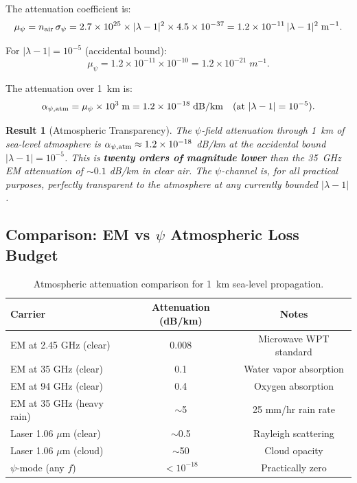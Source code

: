 \documentclass[aps,prd,twocolumn,superscriptaddress]{revtex4-2}
\newtheorem{result}{Result}
\begin{document}
The attenuation coefficient is:
\begin{equation}
\mu_\psi = n_{\rm air}\,\sigma_\psi
= 2.7\times10^{25} \times |\lambda-1|^2 \times 4.5\times10^{-37}
= 1.2\times10^{-11}\,|\lambda-1|^2\;\si{m^{-1}}.
\label{eq:mu-psi}
\end{equation}

For $|\lambda - 1| = 10^{-5}$ (accidental bound):
\begin{equation}
\mu_\psi = 1.2\times10^{-11} \times 10^{-10}
= 1.2\times10^{-21}\;\si{m^{-1}}.
\label{eq:mu-num}
\end{equation}

The attenuation over 1~km is:
\begin{equation}
\alpha_{\psi,\rm atm} = \mu_\psi \times 10^3\;\si{m}
= 1.2\times10^{-18}\;\si{dB/km} \quad
\text{(at }|\lambda-1| = 10^{-5}\text{)}.
\label{eq:alpha-atm}
\end{equation}

\begin{result}[Atmospheric Transparency]
The $\psi$-field attenuation through 1~km of sea-level atmosphere is
$\alpha_{\psi,\rm atm} \approx 1.2\times10^{-18}$ dB/km at the
accidental bound $|\lambda-1| = 10^{-5}$.  This is \textbf{twenty
orders of magnitude lower} than the 35~GHz EM attenuation of
$\sim 0.1$ dB/km in clear air.  The $\psi$-channel is, for all
practical purposes, perfectly transparent to the atmosphere at any
currently bounded $|\lambda - 1|$.
\end{result}

\subsection{Comparison: EM vs $\psi$ Atmospheric Loss Budget}

\begin{table}[h]
\caption{Atmospheric attenuation comparison for 1~km sea-level propagation.}
\label{tab:atm-loss}
\begin{ruledtabular}
\begin{tabular}{lcc}
Carrier & Attenuation (dB/km) & Notes \\
\hline
EM at 2.45 GHz (clear) & 0.008 & Microwave WPT standard \\
EM at 35 GHz (clear) & 0.1 & Water vapor absorption \\
EM at 94 GHz (clear) & 0.4 & Oxygen absorption \\
EM at 35 GHz (heavy rain) & $\sim$5 & 25 mm/hr rain rate \\
Laser 1.06 $\mu$m (clear) & $\sim$0.5 & Rayleigh scattering \\
Laser 1.06 $\mu$m (cloud) & $\sim$50 & Cloud opacity \\
$\psi$-mode (any $f$) & $< 10^{-18}$ & Practically zero \\
\end{tabular}
\end{ruledtabular}
\end{table}
\end{document}
